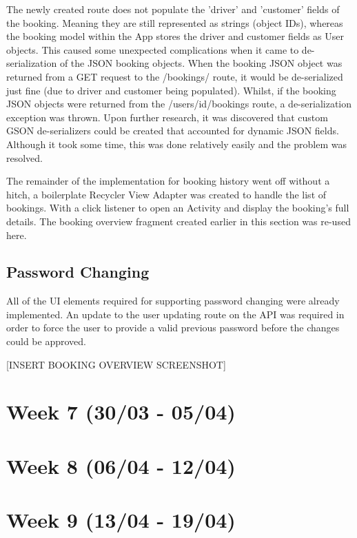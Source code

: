 The newly created route does not populate the 'driver' and 'customer' fields of the booking. Meaning they are still represented as strings (object IDs), whereas the booking model within the App stores the driver and customer fields as User objects. This caused some unexpected complications when it came to de-serialization of the JSON booking objects. When the booking JSON object was returned from a GET request to the /bookings/ route, it would be de-serialized just fine (due to driver and customer being populated). Whilst, if the booking JSON objects were returned from the /users/{id}/bookings route, a de-serialization exception was thrown. Upon further research, it was discovered that custom GSON de-serializers could be created that accounted for dynamic JSON fields. Although it took some time, this was done relatively easily and the problem was resolved.

The remainder of the implementation for booking history went off without a hitch, a boilerplate Recycler View Adapter was created to handle the list of bookings. With a click listener to open an Activity and display the booking's full details. The booking overview fragment created earlier in this section was re-used here.

\subsection{Password Changing}
All of the UI elements required for supporting password changing were already implemented. An update to the user updating route on the API was required in order to force the user to provide a valid previous password before the changes could be approved.

[INSERT BOOKING OVERVIEW SCREENSHOT]

\section{Week 7 (30/03 - 05/04)}
\section{Week 8 (06/04 - 12/04)}
\section{Week 9 (13/04 - 19/04)}

